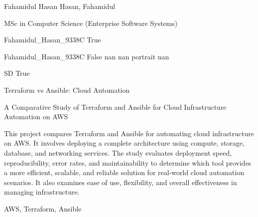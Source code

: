 \documentclass[twoside]{report}
\begin{document}
\begingroup{}\relax



\def\Key{Fahamidul_Hasan_9338C}

{Fahamidul Hasan}
{Hasan, Fahamidul}

{MSc in Computer Science (Enterprise Software Systems)}

{Fahamidul_Hasan_9338C}
{True}

{Fahamidul_Hasan_9338C}
{False}
{nan}
{nan}
{portrait}
{nan}

{SD}
{True}

{Terraform vs Ansible: Cloud Automation}

{A Comparative Study of Terraform and Ansible for Cloud Infrastructure Automation on AWS}

{This project compares Terraform and Ansible for automating cloud infrastructure on AWS. It involves deploying a complete architecture using compute, storage, database, and networking services. The study evaluates deployment speed, reproducibility, error rates, and maintainability to determine which tool provides a more efficient, scalable, and reliable solution for real-world cloud automation scenarios. It also examines ease of use, flexibility, and overall effectiveness in managing infrastructure.}

{AWS, Terraform, Ansible}
\end{document}
